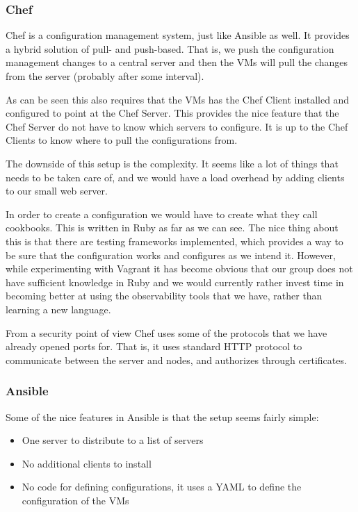 \subsubsection{Chef}

Chef is a configuration management system, just like Ansible as well. It provides a hybrid solution of pull- and push-based. That is, we push the configuration management changes to a central server and then the VMs will pull the changes from the server (probably after some interval).

As can be seen this also requires that the VMs has the Chef Client installed and configured to point at the Chef Server. This provides the nice feature that the Chef Server do not have to know which servers to configure. It is up to the Chef Clients to know where to pull the configurations from.

The downside of this setup is the complexity. It seems like a lot of things that needs to be taken care of, and we would have a load overhead by adding clients to our small web server.

In order to create a configuration we would have to create what they call cookbooks. This is written in Ruby as far as we can see. The nice thing about this is that there are testing frameworks implemented, which provides a way to be sure that the configuration works and configures as we intend it. However, while experimenting with Vagrant it has become obvious that our group does not have sufficient knowledge in Ruby and we would currently rather invest time in becoming better at using the observability tools that we have, rather than learning a new language.

From a security point of view Chef uses some of the protocols that we have already opened ports for. That is, it uses standard HTTP protocol to communicate between the server and nodes, and authorizes through certificates.

\subsubsection{Ansible}

Some of the nice features in Ansible is that the setup seems fairly simple:

\begin{itemize}
    \item One server to distribute to a list of servers
    \item No additional clients to install
    \item No code for defining configurations, it uses a YAML to define the configuration of the VMs
\end{itemize}

